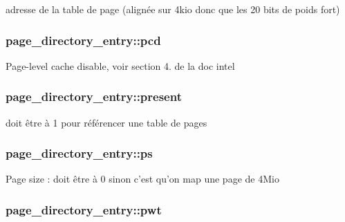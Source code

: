adresse de la table de page (alignée sur 4kio donc que les 20 bits de poids fort) \hypertarget{structpage__directory__entry_ae480766b759f04eeb2443e12d185616a}{
\subsubsection[{pcd}]{ page\+\_\+directory\+\_\+entry\+::pcd}}\label{structpage__directory__entry_ae480766b759f04eeb2443e12d185616a}
Page-\/level cache disable, voir section 4. de la doc intel \hypertarget{structpage__directory__entry_ac5b5f5ab165ce60453db02e68bd7cc22}{
\subsubsection[{present}]{ page\+\_\+directory\+\_\+entry\+::present}}\label{structpage__directory__entry_ac5b5f5ab165ce60453db02e68bd7cc22}
doit être à 1 pour référencer une table de pages \hypertarget{structpage__directory__entry_a35108b74ca7560e2ecf3f296d375c87f}{
\subsubsection[{ps}]{ page\+\_\+directory\+\_\+entry\+::ps}}\label{structpage__directory__entry_a35108b74ca7560e2ecf3f296d375c87f}
Page size \+: doit être à 0 sinon c'est qu'on map une page de 4\+Mio \hypertarget{structpage__directory__entry_a8eea5779d287c1ef5e6f2073b93166a6}{
\subsubsection[{pwt}]{ page\+\_\+directory\+\_\+entry\+::pwt}}\label{structpage__directory__entry_a8eea5779d287c1ef5e6f2073b93166a6}
